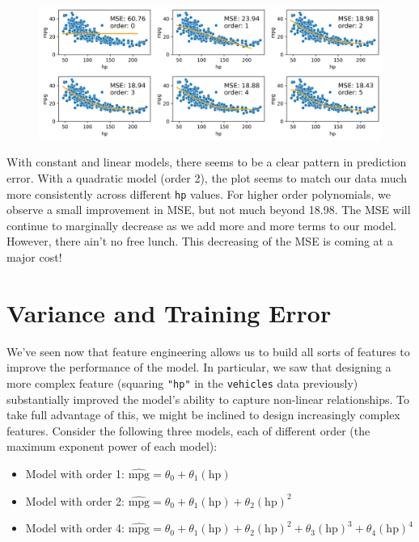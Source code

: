 \documentclass[
  letterpaper,
  DIV=11,
  numbers=noendperiod]{scrreprt}
\providecommand{\tightlist}{%
  \setlength{\itemsep}{0pt}\setlength{\parskip}{0pt}}\usepackage{longtable,booktabs,array}
\begin{document}
\begin{figure}[H]

{\centering \includegraphics{feature_engineering/feature_engineering_files/figure-pdf/cell-5-output-1.png}

}

\end{figure}

With constant and linear models, there seems to be a clear pattern in
prediction error. With a quadratic model (order 2), the plot seems to
match our data much more consistently across different \texttt{hp}
values. For higher order polynomials, we observe a small improvement in
MSE, but not much beyond 18.98. The MSE will continue to marginally
decrease as we add more and more terms to our model. However, there
ain't no free lunch. This decreasing of the MSE is coming at a major
cost!

\hypertarget{variance-and-training-error}{%
\section{Variance and Training
Error}\label{variance-and-training-error}}

We've seen now that feature engineering allows us to build all sorts of
features to improve the performance of the model. In particular, we saw
that designing a more complex feature (squaring \texttt{"hp"} in the
\texttt{vehicles} data previously) substantially improved the model's
ability to capture non-linear relationships. To take full advantage of
this, we might be inclined to design increasingly complex features.
Consider the following three models, each of different order (the
maximum exponent power of each model):

\begin{itemize}
\tightlist
\item
  Model with order 1:
  \(\hat{\text{mpg}} = \theta_0 + \theta_1 (\text{hp})\)
\item
  Model with order 2:
  \(\hat{\text{mpg}} = \theta_0 + \theta_1 (\text{hp}) + \theta_2 (\text{hp})^2\)
\item
  Model with order 4:
  \(\hat{\text{mpg}} = \theta_0 + \theta_1 (\text{hp}) + \theta_2 (\text{hp})^2 + \theta_3 (\text{hp})^3 + \theta_4 (\text{hp})^4\)
\end{itemize}
\end{document}
